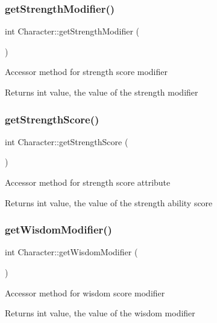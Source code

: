 \subsubsection{\texorpdfstring{get\+Strength\+Modifier()}{getStrengthModifier()}}
{\footnotesize\ttfamily int Character\+::get\+Strength\+Modifier (\begin{DoxyParamCaption}{ }\end{DoxyParamCaption})}

Accessor method for strength score modifier \begin{DoxyReturn}{Returns}
int value, the value of the strength modifier 
\end{DoxyReturn}
\hypertarget{class_character_aaaa0856b0bdcbc38c16ba5117df34ee8}{}\label{class_character_aaaa0856b0bdcbc38c16ba5117df34ee8} 
\subsubsection{\texorpdfstring{get\+Strength\+Score()}{getStrengthScore()}}
{\footnotesize\ttfamily int Character\+::get\+Strength\+Score (\begin{DoxyParamCaption}{ }\end{DoxyParamCaption})}

Accessor method for strength score attribute \begin{DoxyReturn}{Returns}
int value, the value of the strength ability score 
\end{DoxyReturn}
\hypertarget{class_character_a860985777ed1f3f4bb5e4917f052afbd}{}\label{class_character_a860985777ed1f3f4bb5e4917f052afbd} 
\subsubsection{\texorpdfstring{get\+Wisdom\+Modifier()}{getWisdomModifier()}}
{\footnotesize\ttfamily int Character\+::get\+Wisdom\+Modifier (\begin{DoxyParamCaption}{ }\end{DoxyParamCaption})}

Accessor method for wisdom score modifier \begin{DoxyReturn}{Returns}
int value, the value of the wisdom modifier 
\end{DoxyReturn}
\hypertarget{class_character_a07a2c6534ea013efc290aab432c11011}{}\label{class_character_a07a2c6534ea013efc290aab432c11011} 
